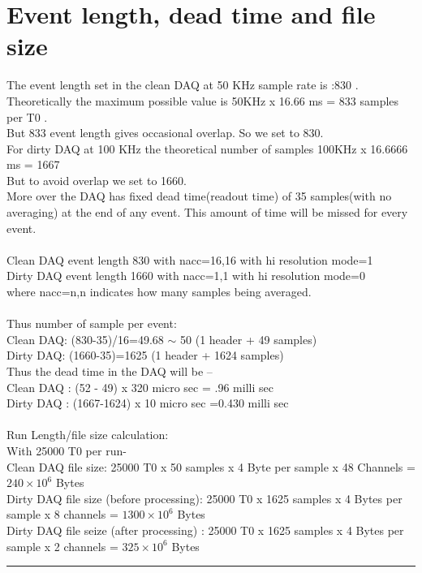 \documentclass[12pt]{article}
\begin{document}
\section{Event length, dead time and file size}
The  event length set in the clean DAQ at 50 KHz sample rate is :830 . Theoretically the maximum possible value is 50KHz x 16.66 ms = 833 samples per T0 . \\
But 833 event length gives occasional overlap. So we set to 830. \\
For dirty DAQ at 100 KHz the theoretical number of samples 100KHz x 16.6666 ms = 1667 \\
But to avoid overlap we set to 1660. \\
More over the DAQ has fixed dead time(readout time) of 35 samples(with no averaging) at the end of any event. This amount of time will be missed for every event.\\
\\
Clean DAQ event length 830 with nacc=16,16 with hi resolution mode=1\\
Dirty DAQ event length 1660 with nacc=1,1 with hi resolution mode=0\\
where nacc=n,n indicates how many samples being averaged.\\
\\
Thus number of sample per event:\\
Clean DAQ: (830-35)/16=49.68 $\sim$ 50  (1 header + 49 samples)\\
Dirty DAQ: (1660-35)=1625 (1 header + 1624 samples) \\
Thus the dead time in the DAQ will be --\\
Clean DAQ : (52 - 49) x 320 micro sec = .96 milli sec\\
Dirty DAQ : (1667-1624) x 10 micro sec =0.430 milli sec\\\\
Run Length/file size calculation:\\
With 25000 T0 per run- \\
Clean DAQ file size: 25000 T0 x 50 samples x 4 Byte per sample x 48 Channels =$240 \times 10^6$ Bytes\\
Dirty DAQ file size (before processing): 25000 T0 x 1625 samples x 4 Bytes per sample x 8 channels = $1300 \times 10^6$ Bytes\\
Dirty DAQ file seize (after processing) : 25000 T0 x 1625 samples x 4 Bytes per sample x 2 channels = $325 \times 10^6$ Bytes\\
\noindent
{\color{red} \rule{\linewidth}{1mm} }
 
\end{document}

